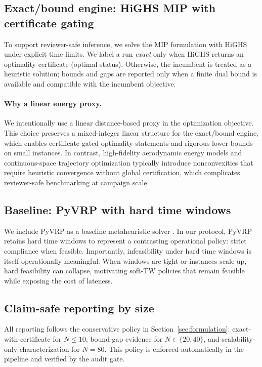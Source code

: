 \subsection{Exact/bound engine: HiGHS MIP with certificate gating}
To support reviewer-safe inference, we solve the MIP formulation with HiGHS \citep{highs} under explicit time limits. We label a run \emph{exact} only when HiGHS returns an optimality certificate (optimal status). Otherwise, the incumbent is treated as a heuristic solution; bounds and gaps are reported only when a finite dual bound is available and compatible with the incumbent objective.

\paragraph{Why a linear energy proxy.}
We intentionally use a linear distance-based proxy in the optimization objective. This choice preserves a mixed-integer linear structure for the exact/bound engine, which enables certificate-gated optimality statements and rigorous lower bounds on small instances. In contrast, high-fidelity aerodynamic energy models and continuous-space trajectory optimization typically introduce nonconvexities that require heuristic convergence without global certification, which complicates reviewer-safe benchmarking at campaign scale.

\subsection{Baseline: PyVRP with hard time windows}
We include PyVRP as a baseline metaheuristic solver \citep{pyvrp}. In our protocol, PyVRP retains hard time windows to represent a contrasting operational policy: strict compliance when feasible. Importantly, infeasibility under hard time windows is itself operationally meaningful. When windows are tight or instances scale up, hard feasibility can collapse, motivating soft-TW policies that remain feasible while exposing the cost of lateness.

\subsection{Claim-safe reporting by size}
All reporting follows the conservative policy in Section~\ref{sec:formulation}: exact-with-certificate for $N\le 10$, bound-gap evidence for $N\in\{20,40\}$, and scalability-only characterization for $N=80$. This policy is enforced automatically in the pipeline and verified by the audit gate.

